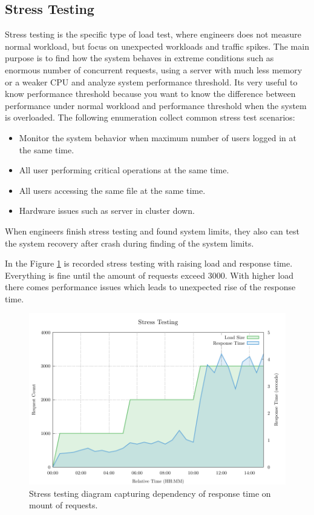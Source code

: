 \subsection*{Stress Testing}
\label{Stress Testing}
Stress testing is the specific type of load test, where engineers does not measure normal workload, but focus on unexpected workloads and traffic spikes. The main purpose is to find how the system behaves in extreme conditions such as enormous number of concurrent requests, using a server with much less memory or a weaker CPU and analyze system performance threshold. Its very useful to know performance threshold because you want to know the difference between performance under normal workload and performance threshold when the system is overloaded. The following enumeration collect common stress test scenarios: 

\begin{itemize}
	\setlength\itemsep{0em}
	\item Monitor the system behavior when maximum number of users logged in at the same time.
	\item All user performing critical operations at the same time.
	\item All users accessing the same file at the same time.
	\item Hardware issues such as server in cluster down.
\end{itemize} 

When engineers finish stress testing and found system limits, they also can test the system recovery after crash during finding of the system limits.

In the Figure \ref{fig:stress_test} is recorded stress testing with raising load and response time. Everything is fine until the amount of requests exceed 3000. With higher load there comes performance issues which leads to unexpected rise of the response time.

\begin{figure}[H]
  \centering
  \includegraphics[width=15cm]{obrazky-figures/stress_testing.pdf}
  \caption{Stress testing diagram capturing dependency of response time on mount of requests.}
  \label{fig:stress_test}
\end{figure}

